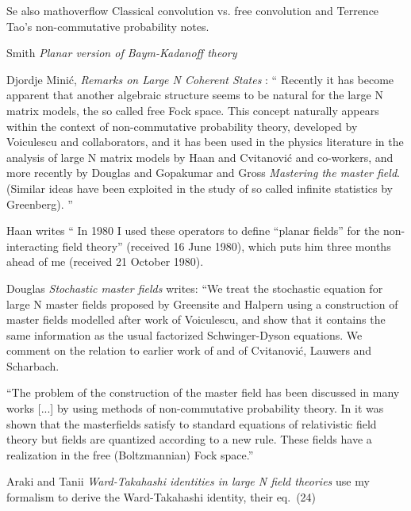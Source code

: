\begin{description}
Se also mathoverflow
{Classical convolution vs. free convolution}
and Terrence Tao's
{non-commutative probability} notes.

Smith {\em Planar version of {Baym-Kadanoff} theory}

Djordje Mini\'c, {\em Remarks on Large N Coherent States}
: `` Recently it has become apparent that another
algebraic structure seems to be natural for the large N matrix models,
the so called free Fock space. This concept naturally appears within the
context of non-commutative probability theory, developed by Voiculescu
and collaborators, and it has been used in the physics
literature in the analysis of large N matrix models by Haan and
Cvitanovi\'c and co-workers, and more recently by
Douglas and Gopakumar and Gross {\em Mastering
the master field}. (Similar ideas have been exploited in the study of so
called infinite statistics by Greenberg).
''

Haan writes `` In 1980 I used these operators to define ``planar fields''
for the non-interacting field theory'' (received 16 June
1980), which puts him three months ahead of me (received
21 October 1980).

Douglas {\em Stochastic master fields} writes: ``We treat
the stochastic equation for large N master fields proposed by Greensite
and Halpern using a construction of master fields modelled after work of
Voiculescu, and show that it contains the same information as the usual
factorized Schwinger-Dyson equations. We comment on the relation to
earlier work of  and of Cvitanovi\'c, Lauwers and
Scharbach.

``The problem of the construction of the master field has been discussed in
many works [...] by using methods of non-commutative
probability theory. In 
it was shown that the masterfields satisfy to standard equations of
relativistic field theory but fields are quantized according to a new
rule. These fields have a realization in the free (Boltzmannian)
Fock space.''

Araki and Tanii
{\em {Ward-Takahashi} identities in large {N} field theories}
use my formalism to derive the {Ward-Takahashi} identity,
their eq.~(24)


\end{description}
